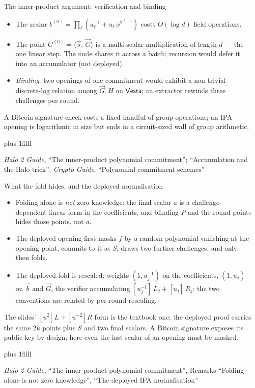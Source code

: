 \documentclass[aspectratio=169,11pt]{beamer}
\newcommand{\Vesta}{\ensuremath{\mathsf{Vesta}}}
\newcommand{\ip}[2]{\langle #1,\, #2 \rangle}
\newcommand{\src}[1]{\par\vskip0pt plus 1filll
  {\fontsize{6}{7.2}\selectfont\color{arbdim}\raggedright #1\par}}
\begin{document}
\begin{frame}{The inner-product argument: verification and binding}
\begin{itemize}
  \item The scalar $b^{(0)} = \prod_{\ell}(u_\ell^{-1} + u_\ell\,
    x^{2^{\ell-1}})$ costs $O(\log d)$ field operations.
  \item The point $G^{(0)} = \ip{\vec s}{\vec G}$ is a multi-scalar
    multiplication of length $d$ --- the one linear step. The node shares
    it across a batch; recursion would defer it into an accumulator (not
    deployed).
  \item \emph{Binding}: two openings of one commitment would exhibit a
    non-trivial discrete-log relation among $\vec G, H$ on \Vesta; an
    extractor rewinds three challenges per round.
\end{itemize}
A Bitcoin signature check costs a fixed handful of group operations; an
IPA opening is logarithmic in size but ends in a circuit-sized wall of
group arithmetic.
\src{\emph{Halo 2 Guide}, ``The inner-product polynomial commitment'';
``Accumulation and the Halo trick''; \emph{Crypto Guide}, ``Polynomial
commitment schemes''}
\end{frame}

\begin{frame}{What the fold hides, and the deployed normalisation}
\begin{itemize}
  \item Folding alone is \emph{not} zero knowledge: the final scalar
    $a$ is a challenge-dependent linear form in the coefficients, and
    blinding $P$ and the round points hides those points, not $a$.
  \item The deployed opening first masks $f$ by a random polynomial
    vanishing at the opening point, commits to it as $S$, draws two
    further challenges, and only then folds.
  \item The deployed fold is rescaled: weights $(1, u_j^{-1})$ on the
    coefficients, $(1, u_j)$ on $\vec b$ and $\vec G$, the verifier
    accumulating $[u_j^{-1}]\,L_j + [u_j]\,R_j$; the two conventions
    are related by per-round rescaling.
\end{itemize}
The slides' $[u^2]L + [u^{-2}]R$ form is the textbook one; the deployed
proof carries the same $2k$ points plus $S$ and two final scalars. A
Bitcoin signature exposes its public key by design; here even the last
scalar of an opening must be masked.
\src{\emph{Halo 2 Guide}, ``The inner-product polynomial commitment'',
Remarks ``Folding alone is not zero knowledge'', ``The deployed IPA
normalisation''}
\end{frame}
\end{document}
